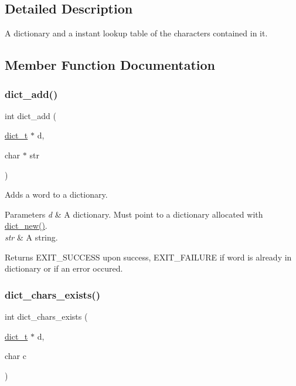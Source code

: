 \subsection{Detailed Description}
A dictionary and a instant lookup table of the characters contained in it. 

\subsection{Member Function Documentation}
\mbox{\label{structdict__t_ab4825a90819a79433cd1f4f6034b4fc1}} 
\subsubsection{\texorpdfstring{dict\+\_\+add()}{dict\_add()}}
{\footnotesize\ttfamily int dict\+\_\+add (\begin{DoxyParamCaption}\item[{\mbox{\hyperlink{structdict__t}{dict\+\_\+t}} $\ast$}]{d,  }\item[{char $\ast$}]{str }\end{DoxyParamCaption})}



Adds a word to a dictionary. 


\begin{DoxyParams}{Parameters}
{\em d} & A dictionary. Must point to a dictionary allocated with \mbox{\hyperlink{structdict__t_a0074913fdba65680670bf93153225e2f}{dict\+\_\+new()}}. \\
\hline
{\em str} & A string. \\
\hline
\end{DoxyParams}
\begin{DoxyReturn}{Returns}
E\+X\+I\+T\+\_\+\+S\+U\+C\+C\+E\+SS upon success, E\+X\+I\+T\+\_\+\+F\+A\+I\+L\+U\+RE if word is already in dictionary or if an error occured. 
\end{DoxyReturn}
\mbox{\label{structdict__t_acc7f38511d6fbf572b62e2aeac7ffddc}} 
\subsubsection{\texorpdfstring{dict\+\_\+chars\+\_\+exists()}{dict\_chars\_exists()}}
{\footnotesize\ttfamily int dict\+\_\+chars\+\_\+exists (\begin{DoxyParamCaption}\item[{\mbox{\hyperlink{structdict__t}{dict\+\_\+t}} $\ast$}]{d,  }\item[{char}]{c }\end{DoxyParamCaption})}



